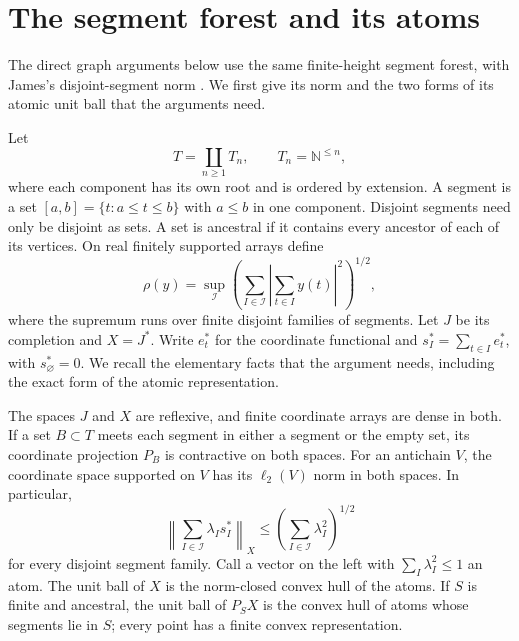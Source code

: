 \section{The segment forest and its atoms}\label{dir:forest-definition}
The direct graph arguments below use the same finite-height segment forest,
with James's disjoint-segment norm \cite[p.~739]{James1974}.
We first give its norm and the two forms of its atomic unit ball that the
arguments need.

Let
\[
 T=\coprod_{n\ge1} T_n,\qquad T_n=\mathbb N^{\le n},
\]
where each component has its own root and is ordered by extension.  A segment
is a set $[a,b]=\{t:a\le t\le b\}$ with $a\le b$ in one component.
Disjoint segments need only be disjoint as sets. A set is ancestral if it contains every ancestor of each of its vertices.  On real finitely supported
arrays define
\begin{equation}\label{dir:atomic:forest-norm}
 \rho(y)=
 \sup_{\mathcal I}
 \left(\sum_{I\in\mathcal I}\left|\sum_{t\in I}y(t)\right|^2\right)^{1/2},
\end{equation}
where the supremum runs over finite disjoint families of segments.  Let $J$
be its completion and $X=J^*$.  Write $e_t^*$ for the coordinate functional
and $s_I^*=\sum_{t\in I}e_t^*$, with $s_\varnothing^*=0$.  We recall the elementary facts that the
argument needs, including the exact form of the atomic representation.

\begin{lemma}\label{dir:atomic:atoms}
The spaces $J$ and $X$ are reflexive, and finite coordinate arrays are dense
in both.  If a set $B\subset T$ meets each segment in either a segment or the
empty set, its coordinate projection $P_B$ is contractive on both spaces.
For an antichain $V$, the coordinate space supported on $V$ has its
$\ell_2(V)$ norm in both spaces.  In particular,
\begin{equation}\label{dir:atomic:atom-bound}
 \left\|\sum_{I\in\mathcal I}\lambda_I s_I^*\right\|_X
 \le\left(\sum_{I\in\mathcal I}\lambda_I^2\right)^{1/2}
\end{equation}
for every disjoint segment family.
Call a vector on the left with $\sum_I\lambda_I^2\le1$ an atom.  The unit
ball of $X$ is the norm-closed convex hull of the atoms.  If $S$ is finite
and ancestral, the unit ball of $P_SX$ is the convex hull of atoms
whose segments lie in $S$; every point has a finite convex representation.
\end{lemma}

